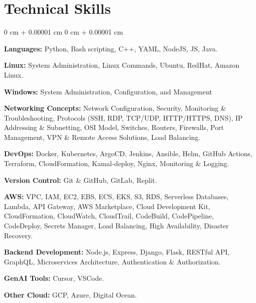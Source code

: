 \documentclass[10pt, letterpaper]{article}
\newenvironment{onecolentry}{
    \begin{adjustwidth}{
        0 cm + 0.00001 cm
    }{
        0 cm + 0.00001 cm
    }
}{
    \end{adjustwidth}
}
\begin{document}
\section{Technical Skills}
\vspace{0.10 cm}
\begin{onecolentry}
    \textbf{Languages:} Python, Bash scripting, C++, YAML, NodeJS, JS, Java.
    \vspace{0.1cm}
    
    \textbf{Linux:} System Administration, Linux Commands, Ubuntu, RedHat, Amazon Linux.
    \vspace{0.1cm}
    
    \textbf{Windows:} System Administration, Configuration, and Management
    \vspace{0.1cm}
        
    \textbf{Networking Concepts:} Network Configuration, Security, Monitoring \& Troubleshooting, Protocols (SSH, RDP, TCP/UDP, HTTP/HTTPS, DNS), IP Addressing \& Subnetting, OSI Model, Switches, Routers, Firewalls, Port Management, VPN \& Remote Access Solutions, Load Balancing.
    \vspace{0.1cm}
    
    \textbf{DevOps:} Docker, Kubernetes, ArgoCD, Jenkins, Ansible, Helm, GitHub Actions, Terraform, CloudFormation, Kamal-deploy, Nginx, Monitoring \& Logging.
    \vspace{0.1cm}
    
    \textbf{Version Control:} Git \& GitHub, GitLab, Replit.
    \vspace{0.1cm}
    
    \textbf{AWS:} VPC, IAM, EC2, EBS, ECS, EKS, S3, RDS, Serverless Databases, Lambda, API Gateway, AWS Marketplace, Cloud Development Kit, CloudFormation, CloudWatch, CloudTrail, CodeBuild, CodePipeline, CodeDeploy, Secrets Manager, Load Balancing, High Availability, Disaster Recovery.
    \vspace{0.1cm}
        
    \textbf{Backend Development:} Node.js, Express, Django, Flask, RESTful API, GraphQL, Microservices Architecture, Authentication \& Authorization.
    \vspace{0.1cm}

    \textbf{GenAI Tools:} Cursor, VSCode.
    \vspace{0.1cm}
    
    \textbf{Other Cloud:} GCP, Azure, Digital Ocean. 
\end{onecolentry}
\end{document}
